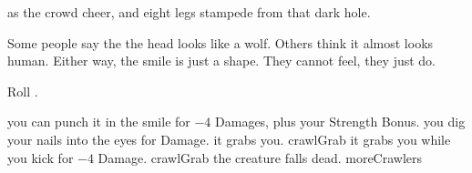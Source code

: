 as the crowd cheer, and eight legs stampede from that dark hole.

Some people say the the head looks like a wolf.
Others think it almost looks human.
Either way, the smile is just a shape.
They cannot feel, they just do.

Roll .

\begin{selectPath}
  {you can punch it in the smile for  $ - 4$ Damages, plus your Strength Bonus.}%
  {}
  {you dig your nails into the eyes for  Damage.}%
  {}
  {it grabs you.}%
  {crawlGrab}
  {it grabs you while you kick for  $ - 4$ Damage.}%
  {crawlGrab}
  {the creature falls dead.}%
  {moreCrawlers}
\end{selectPath}

